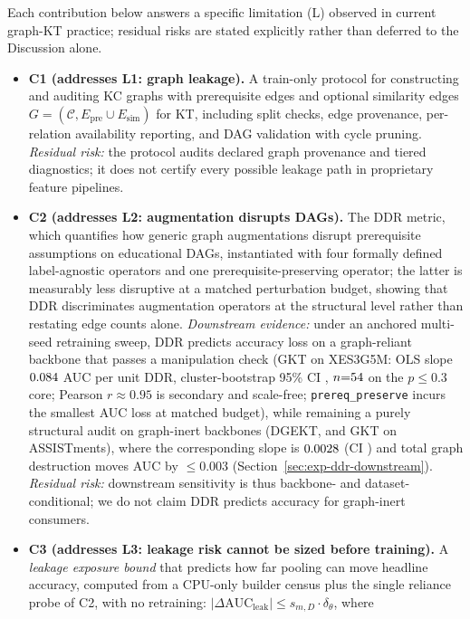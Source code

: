 \documentclass[preprint,10pt,doubleblind]{elsarticle}
\newcommand{\Epre}{\ensuremath{E_{\text{pre}}}}
\newcommand{\Esim}{\ensuremath{E_{\text{sim}}}}
\newcommand{\DDR}{\textsc{DDR}}
\begin{document}
Each contribution below answers a specific limitation (L) observed in
current graph-KT practice; residual risks are stated explicitly rather
than deferred to the Discussion alone.
\begin{itemize}
  \item \textbf{C1 (addresses L1: graph leakage).} A train-only protocol
  for constructing and auditing KC graphs with prerequisite edges and
  optional similarity edges $G=(\mathcal{C}, \Epre \cup \Esim)$ for KT,
  including split checks, edge provenance, per-relation availability
  reporting, and DAG validation with cycle pruning.
  \emph{Residual risk:} the protocol audits declared graph provenance and
  tiered diagnostics; it does not certify every possible leakage path in
  proprietary feature pipelines.
  \item \textbf{C2 (addresses L2: augmentation disrupts DAGs).} The
  \DDR{} metric, which quantifies how generic graph augmentations disrupt
  prerequisite assumptions on educational DAGs, instantiated with four
  formally defined label-agnostic operators and one prerequisite-preserving
  operator; the latter is measurably less disruptive at a matched
  perturbation budget, showing that \DDR{} discriminates augmentation
  operators at the structural level rather than restating edge counts alone.
  \emph{Downstream evidence:} under an anchored multi-seed retraining sweep, \DDR{}
  predicts accuracy loss on a graph-reliant backbone that passes a
  manipulation check (GKT on XES3G5M: OLS slope $0.084$ AUC per unit
  \DDR{}, cluster-bootstrap 95\% CI \DDRslopeXEScoreci, $n{=}54$ on
  the $p{\le}0.3$ core; Pearson $r{\approx}0.95$ is secondary and scale-free;
  \texttt{prereq\_preserve}
  incurs the smallest AUC loss at matched budget), while remaining a purely structural
  audit on graph-inert backbones (DGEKT, and GKT on ASSISTments), where the
  corresponding slope is $0.0028$ (CI \DDRslopeASSISTcoreci) and total
  graph destruction moves AUC by ${\le}0.003$ (Section~\ref{sec:exp-ddr-downstream}).
  \emph{Residual risk:} downstream sensitivity is thus backbone- and
  dataset-conditional; we do not claim \DDR{} predicts accuracy for graph-inert
  consumers.
  \item \textbf{C3 (addresses L3: leakage risk cannot be sized before
  training).} A \emph{leakage exposure bound} that predicts how far pooling can
  move headline accuracy, computed from a CPU-only builder census plus the
  single reliance probe of C2, with no retraining:
  $|\Delta\text{AUC}_{\text{leak}}|\le s_{m,D}\cdot\delta_{\theta}$, where

\end{itemize}
\end{document}
